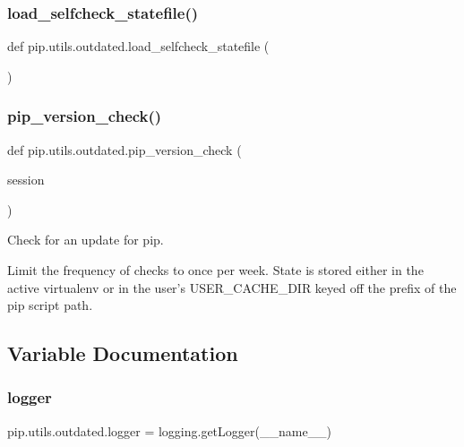 \subsubsection{\texorpdfstring{load\+\_\+selfcheck\+\_\+statefile()}{load\_selfcheck\_statefile()}}
{\footnotesize\ttfamily def pip.\+utils.\+outdated.\+load\+\_\+selfcheck\+\_\+statefile (\begin{DoxyParamCaption}{ }\end{DoxyParamCaption})}

\mbox{\label{namespacepip_1_1utils_1_1outdated_a40b845338f66acebadff26c747ae9c86}} 
\subsubsection{\texorpdfstring{pip\+\_\+version\+\_\+check()}{pip\_version\_check()}}
{\footnotesize\ttfamily def pip.\+utils.\+outdated.\+pip\+\_\+version\+\_\+check (\begin{DoxyParamCaption}\item[{}]{session }\end{DoxyParamCaption})}

\begin{DoxyVerb}Check for an update for pip.

Limit the frequency of checks to once per week. State is stored either in
the active virtualenv or in the user's USER_CACHE_DIR keyed off the prefix
of the pip script path.
\end{DoxyVerb}
 

\subsection{Variable Documentation}
\mbox{\label{namespacepip_1_1utils_1_1outdated_a8d835a5e8bc910159ca9898e156c06c1}} 
\subsubsection{\texorpdfstring{logger}{logger}}
{\footnotesize\ttfamily pip.\+utils.\+outdated.\+logger = logging.\+get\+Logger(\+\_\+\+\_\+name\+\_\+\+\_\+)}

